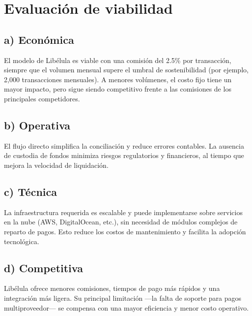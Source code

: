 \documentclass[12pt,a4paper]{article}
\begin{document}
	\section*{Evaluación de viabilidad}
	\subsection*{a) Económica}
	El modelo de Libélula es viable con una comisión del 2.5\% por transacción, siempre que el volumen mensual supere el umbral de sostenibilidad (por ejemplo, 2,000 transacciones mensuales). A menores volúmenes, el costo fijo tiene un mayor impacto, pero sigue siendo competitivo frente a las comisiones de los principales competidores.
	
	\subsection*{b) Operativa}
	El flujo directo simplifica la conciliación y reduce errores contables. La ausencia de custodia de fondos minimiza riesgos regulatorios y financieros, al tiempo que mejora la velocidad de liquidación.
	
	\subsection*{c) Técnica}
	La infraestructura requerida es escalable y puede implementarse sobre servicios en la nube (AWS, DigitalOcean, etc.), sin necesidad de módulos complejos de reparto de pagos. Esto reduce los costos de mantenimiento y facilita la adopción tecnológica.
	
	\subsection*{d) Competitiva}
	Libélula ofrece menores comisiones, tiempos de pago más rápidos y una integración más ligera. Su principal limitación ---la falta de soporte para pagos multiproveedor--- se compensa con una mayor eficiencia y menor costo operativo.
	
\end{document}
